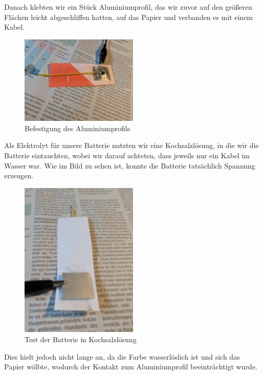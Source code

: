 \documentclass[a4paper,12pt]{article}
\begin{document}
\noindent Danach klebten wir ein Stück Aluminiumprofil, das wir zuvor auf den größeren Flächen leicht abgeschliffen hatten, auf das Papier und verbanden es mit einem Kabel.

\begin{figure}[h!]
\centering
\includegraphics[width=0.5\textwidth]{Bild4}
\caption{Befestigung des Aluminiumprofils}
\label{fig:bild4}
\end{figure}

\noindent Als Elektrolyt für unsere Batterie nutzten wir eine Kochsalzlösung, in die wir die Batterie eintauchten, wobei wir darauf achteten, dass jeweils nur ein Kabel im Wasser war. Wie im Bild zu sehen ist, konnte die Batterie tatsächlich Spannung erzeugen.

\begin{figure}[h!]
\centering
\includegraphics[width=0.5\textwidth]{Bild5}
\caption{Test der Batterie in Kochsalzlösung}
\label{fig:bild5}
\end{figure}

\noindent Dies hielt jedoch nicht lange an, da die Farbe wasserlöslich ist und sich das Papier wölbte, wodurch der Kontakt zum Aluminiumprofil beeinträchtigt wurde.
\end{document}
